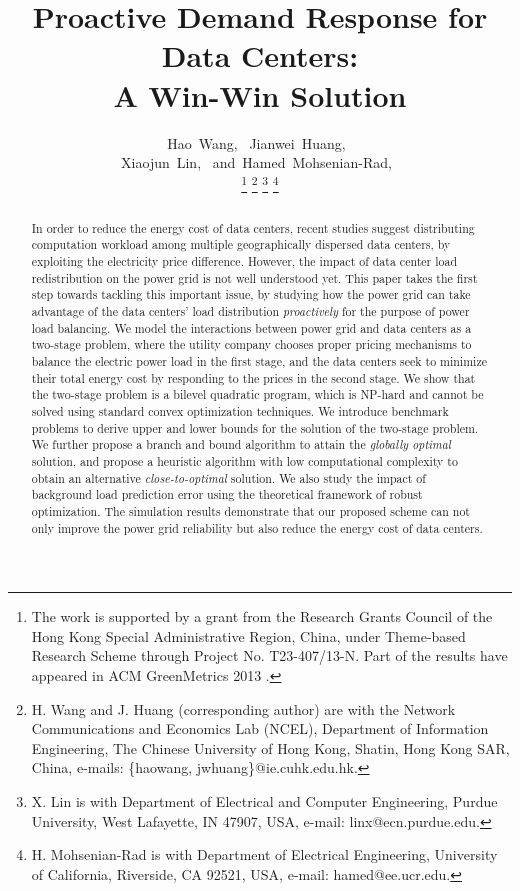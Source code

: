 \documentclass[journal]{IEEEtran}
\begin{document}
	\title{Proactive Demand Response for Data Centers: \\A Win-Win Solution}
	
	\author{Hao~Wang,~
		Jianwei~Huang,~\\
		Xiaojun~Lin,~
		and~Hamed~Mohsenian-Rad,~
		
		\thanks{The work is supported by a grant from the Research Grants Council of the Hong Kong Special Administrative Region, China, under Theme-based Research Scheme through Project No. T23-407/13-N. Part of the results have appeared in ACM GreenMetrics 2013 \cite{ourpaper}.}
		\thanks{H. Wang and J. Huang (corresponding author) are with the Network Communications and Economics Lab (NCEL), Department of Information Engineering, The Chinese University of Hong Kong, Shatin, Hong Kong SAR, China, e-mails: \{haowang, jwhuang\}@ie.cuhk.edu.hk.}
		\thanks{X. Lin is with Department of Electrical and Computer Engineering, Purdue University, West Lafayette, IN 47907, USA, e-mail: linx@ecn.purdue.edu.}
		\thanks{H. Mohsenian-Rad is with Department of Electrical Engineering, University of California, Riverside, CA 92521, USA, e-mail: hamed@ee.ucr.edu.}
	}
	\maketitle
	\thispagestyle{empty}  

	
	\begin{abstract}
		In order to reduce the energy cost of data centers, recent studies suggest distributing computation workload among multiple geographically dispersed data centers, by exploiting the electricity price difference. However, the impact of data center load redistribution on the power grid is not well understood yet. This paper takes the first step towards tackling this important issue, by studying how the power grid can take advantage of the data centers' load distribution \emph{proactively} for the purpose of power load balancing. We model the interactions between power grid and data centers as a two-stage problem, where the utility company chooses proper pricing mechanisms to balance the electric power load in the first stage, and the data centers seek to minimize their total energy cost by responding to the prices in the second stage. We show that the two-stage problem is a bilevel quadratic program, which is NP-hard and cannot be solved using standard convex optimization techniques. We introduce benchmark problems to derive upper and lower bounds for the solution of the two-stage problem. We further propose a branch and bound algorithm to attain the \emph{globally optimal} solution, and propose a heuristic algorithm with low computational complexity to obtain an alternative \emph{close-to-optimal} solution. We also study the impact of background load prediction error using the
		theoretical framework of robust optimization. The simulation results demonstrate that our proposed scheme can not only improve the power grid reliability but also reduce the energy cost of data centers.
	\end{abstract}
	
\end{document}
